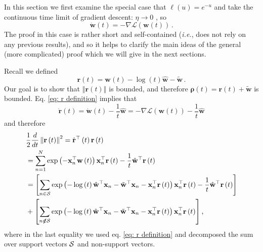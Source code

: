 \documentclass[twoside,11pt,english]{article}
\begin{document}
In this section we first examine the special case that $\ell\left(u\right)=e^{-u}$
and take the continuous time limit of gradient descent: $\eta\rightarrow0$
, so 
\[
\dot{\mathbf{w}}\left(t\right)=-\nabla\mathcal{L}\left(\mathbf{w}\left(t\right)\right)\,.
\]
The proof in this case is rather short and self-contained (\emph{i.e.}, does
not rely on any previous results), and so it helps to clarify the
main ideas of the general (more complicated) proof which we will give
in the next sections.

Recall we defined 
\begin{equation}
\mathbf{r}\left(t\right)=\mathbf{w}\left(t\right)-\log\left(t\right)\hat{\mathbf{w}}-\tilde{\mathbf{w}}\,.\label{eq: r definition}
\end{equation}
Our goal is to show that $\left\Vert \mathbf{r}\left(t\right)\right\Vert $
is bounded, and therefore $\boldsymbol{\rho}\left(t\right)=\mathbf{r}\left(t\right)+\tilde{\mathbf{w}}$
is bounded. Eq. \ref{eq: r definition} implies that 
\begin{equation}
\dot{\mathbf{r}}\left(t\right)=\dot{\mathbf{w}}\left(t\right)-\frac{1}{t}\hat{\mathbf{w}}=-\nabla\mathcal{L}\left(\mathbf{w}\left(t\right)\right)-\frac{1}{t}\hat{\mathbf{w}}\label{eq: r dot}
\end{equation}
and therefore 
\begin{align}
 & \frac{1}{2}\frac{d}{dt}\left\Vert \mathbf{r}\left(t\right)\right\Vert ^{2}=\dot{\mathbf{r}}^{\top}\left(t\right)\mathbf{r}\left(t\right)\nonumber \\
 & =\sum_{n=1}^{N}\exp\left(-\mathbf{x}_{n}^{\top}\mathbf{w}\left(t\right)\right)\mathbf{x}_{n}^{\top}\mathbf{r}\left(t\right)-\frac{1}{t}\hat{\mathbf{w}}^{\top}\mathbf{r}\left(t\right)\nonumber \\
 & =\left[\sum_{n\in\mathcal{S}}\exp\left(-\log\left(t\right)\hat{\mathbf{w}}^{\top}\mathbf{x}_{n}-\tilde{\mathbf{w}}^{\top}\mathbf{x}_{n}-\mathbf{x}_{n}^{\top}\mathbf{r}\left(t\right)\right)\mathbf{x}_{n}^{\top}\mathbf{r}\left(t\right)-\frac{1}{t}\hat{\mathbf{w}}^{\top}\mathbf{r}\left(t\right)\right]\nonumber \\
 & +\left[\sum_{n\not\notin\mathcal{S}}\exp\left(-\log\left(t\right)\hat{\mathbf{w}}^{\top}\mathbf{x}_{n}-\tilde{\mathbf{w}}^{\top}\mathbf{x}_{n}-\mathbf{x}_{n}^{\top}\mathbf{r}\left(t\right)\right)\mathbf{x}_{n}^{\top}\mathbf{r}\left(t\right)\right]\text{,}\label{eq: dr^2/dt}
\end{align}
where in the last equality we used eq. \ref{eq: r definition} and
decomposed the sum over support vectors $\mathcal{S}$ and non-support vectors.
\end{document}
